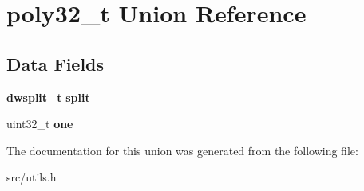 \section{poly32\+\_\+t Union Reference}
\label{unionpoly32__t}
\subsection*{Data Fields}
\begin{DoxyCompactItemize}
\item 
\mbox{\label{unionpoly32__t_aa1656c9297adb0902220ce6a9658d1c8}} 
\textbf{ dwsplit\+\_\+t} {\bfseries split}
\item 
\mbox{\label{unionpoly32__t_a2a322792b321b920bbf4a99f0fe46d3b}} 
uint32\+\_\+t {\bfseries one}
\end{DoxyCompactItemize}


The documentation for this union was generated from the following file\+:\begin{DoxyCompactItemize}
\item 
src/utils.\+h\end{DoxyCompactItemize}
